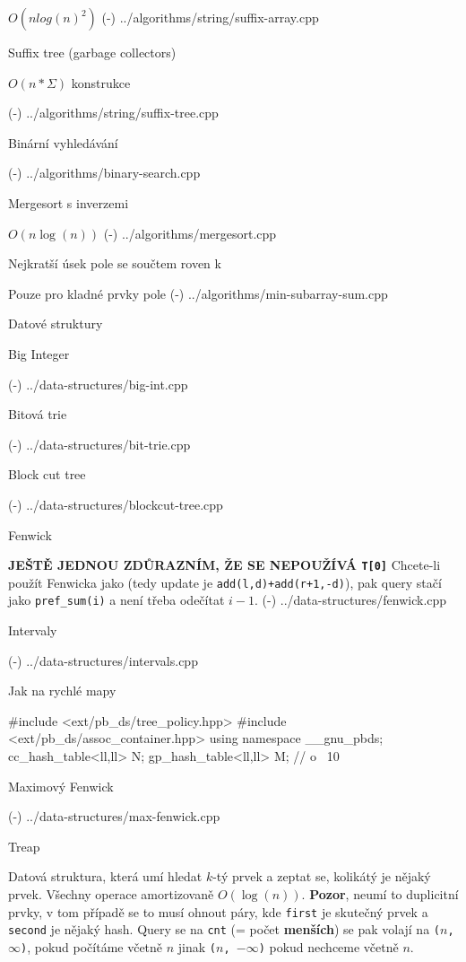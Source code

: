 $O(n log(n)^2)$
\verbinput (-) ../algorithms/string/suffix-array.cpp

\secc Suffix tree (garbage collectors)

$O(n * \Sigma)$ konstrukce

\verbinput (-) ../algorithms/string/suffix-tree.cpp

\sec Binární vyhledávání 

\verbinput (-) ../algorithms/binary-search.cpp

\sec Mergesort s inverzemi 

$O(n\log(n))$
\verbinput (-) ../algorithms/mergesort.cpp

\sec Nejkratší úsek pole se součtem roven k 

Pouze pro kladné prvky pole
\verbinput (-) ../algorithms/min-subarray-sum.cpp

\newpage

\chap Datové struktury

\sec Big Integer 

\verbinput (-) ../data-structures/big-int.cpp

\sec Bitová trie 

\verbinput (-) ../data-structures/bit-trie.cpp

\sec Block cut tree 

\verbinput (-) ../data-structures/blockcut-tree.cpp

\sec Fenwick

{\bf JEŠTĚ JEDNOU ZDŮRAZNÍM, ŽE SE NEPOUŽÍVÁ {\tt T[0]}}\linebreak
Chcete-li použít Fenwicka jako  (tedy update je {\tt add(l,d)+add(r+1,-d)}), pak query stačí jako {\tt pref\_sum(i)} a není třeba odečítat $i-1$.
\verbinput (-) ../data-structures/fenwick.cpp

\sec Intervaly

\verbinput (-) ../data-structures/intervals.cpp

\sec Jak na rychlé mapy 

\begtt
#include <ext/pb_ds/tree_policy.hpp>
#include <ext/pb_ds/assoc_container.hpp>
using namespace __gnu_pbds;
cc_hash_table<ll,ll> N;
gp_hash_table<ll,ll> M; // o ~10%
\endtt

\sec Maximový Fenwick 

\verbinput (-) ../data-structures/max-fenwick.cpp

\sec Treap

Datová struktura, která umí hledat $k$-tý prvek a zeptat se, kolikátý je nějaký prvek.
Všechny operace amortizovaně $O(\log(n))$.
{\bf Pozor}, neumí to duplicitní prvky, v tom případě se to musí ohnout páry, kde {\tt first} je skutečný prvek a {\tt second} je nějaký hash.
Query se na {\tt cnt} (= počet {\bf menších}) se pak volají na {\tt ($n$, $\infty$)}, pokud počítáme včetně $n$ jinak {\tt ($n$, $-\infty$)} pokud nechceme včetně $n$.

